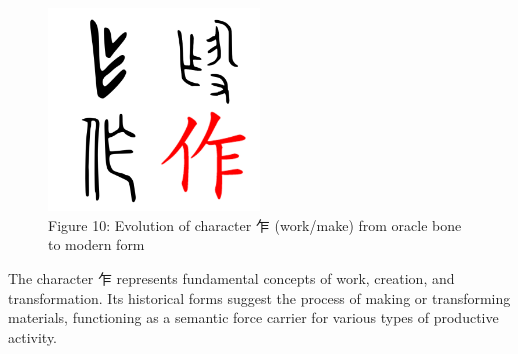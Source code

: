 \documentclass[
  11pt,
  letterpaper,
]{article}
\begin{document}
\begin{figure}
\centering
\includegraphics[width=0.5\textwidth]{./images/zi_work.png}
\caption{Figure 10: Evolution of
character 乍 (work/make) from oracle bone to modern form}
\end{figure}

The character 乍 represents fundamental concepts of work, creation, and
transformation. Its historical forms suggest the process of making or
transforming materials, functioning as a semantic force carrier for
various types of productive activity.
\end{document}
